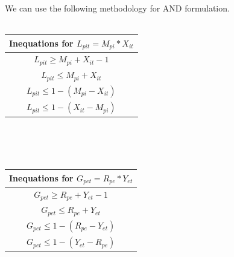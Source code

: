 \documentclass{article}
\begin{document}
\noindent We can use the following methodology for AND formulation.\\\\
\begin{tabular}{|c|}
\hline
Inequations for $L_{pit}=M_{pi}*X_{it}$\\
\hline
$L_{pit} \geq M_{pi} + X_{it} - 1$\\
$L_{pit} \leq M_{pi} + X_{it}$\\
$L_{pit} \leq 1-(M_{pi} - X_{it})$\\
$L_{pit} \leq 1-(X_{it} - M_{pi})$\\
\hline 
\end{tabular}
\\\\\\
\begin{tabular}{|c|}
\hline
Inequations for $G_{pet}=R_{pe}*Y_{et}$\\
\hline
$G_{pet} \geq R_{pe} + Y_{et} - 1$\\
$G_{pet} \leq R_{pe} + Y_{et}$\\
$G_{pet} \leq 1-(R_{pe} - Y_{et})$\\
$G_{pet} \leq 1-(Y_{et} - R_{pe})$\\
\hline 
\end{tabular}
 
\end{document}
